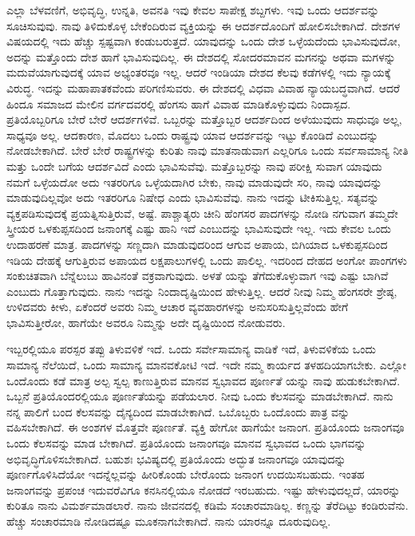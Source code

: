 ಎಲ್ಲಾ ಬೆಳವಣಿಗೆ, ಅಭಿವೃದ್ಧಿ, ಉನ್ನತಿ, ಅವನತಿ ಇವು ಕೇವಲ ಸಾಪೇಕ್ಷ ಶಬ್ದಗಳು. ಇವು ಒಂದು ಆದರ್ಶವನ್ನು ಸೂಚಿಸುವುವು. ನಾವು ತಿಳಿದುಕೊಳ್ಳ ಬೇಕೆಂದಿರುವ ವ್ಯಕ್ತಿಯನ್ನು ಈ ಆದರ್ಶದೊಂದಿಗೆ ಹೋಲಿಸಬೇಕಾಗಿದೆ. ದೇಶಗಳ ವಿಷಯದಲ್ಲಿ ಇದು ಹೆಚ್ಚು ಸ್ಪಷ್ಟವಾಗಿ ಕಂಡುಬರುತ್ತದೆ. ಯಾವುದನ್ನು ಒಂದು ದೇಶ ಒಳ್ಳೆಯದೆಂದು ಭಾವಿಸುವುದೋ, ಅದನ್ನು ಮತ್ತೊಂದು ದೇಶ ಹಾಗೆ ಭಾವಿಸುವುದಿಲ್ಲ. ಈ ದೇಶದಲ್ಲಿ ಸೋದರಮಾವನ ಮಗನನ್ನು ಅಥವಾ ಮಗಳನ್ನು ಮದುವೆಯಾಗುವುದಕ್ಕೆ ಯಾವ ಅಭ್ಯಂತರವೂ ಇಲ್ಲ. ಆದರೆ ಇಂಡಿಯಾ ದೇಶದ ಕೆಲವು ಕಡೆಗಳಲ್ಲಿ ಇದು ನ್ಯಾಯಕ್ಕೆ ವಿರುದ್ಧ. ಇದನ್ನು ಮಹಾಪಾತಕವೆಂದು ಪರಿಗಣಿಸುವರು. ಈ ದೇಶದಲ್ಲಿ ವಿಧವಾ ವಿವಾಹ ನ್ಯಾಯಬದ್ಧವಾಗಿದೆ. ಆದರೆ ಹಿಂದೂ ಸಮಾಜದ ಮೇಲಿನ ವರ್ಗದವರಲ್ಲಿ ಹೆಂಗಸು ಹಾಗೆ ವಿವಾಹ ಮಾಡಿಕೊಳ್ಳುವುದು ನಿಂದಾಸ್ಪದ. ಪ್ರತಿಯೊಬ್ಬರಿಗೂ ಬೇರೆ ಬೇರೆ ಆದರ್ಶಗಳಿವೆ. ಒಬ್ಬರನ್ನು ಮತ್ತೊಬ್ಬರ ಆದರ್ಶದಿಂದ ಅಳೆಯುವುದು ಸಾಧುವೂ ಅಲ್ಲ, ಸಾಧ್ಯವೂ ಅಲ್ಲ. ಆದಕಾರಣ, ಮೊದಲು ಒಂದು ರಾಷ್ಟ್ರವು ಯಾವ ಆದರ್ಶವನ್ನು ಇಟ್ಟು ಕೊಂಡಿದೆ ಎಂಬುದನ್ನು ನೋಡಬೇಕಾಗಿದೆ. ಬೇರೆ ಬೇರೆ ರಾಷ್ಟ್ರಗಳನ್ನು ಕುರಿತು ನಾವು ಮಾತನಾಡುವಾಗ ಎಲ್ಲರಿಗೂ ಒಂದು ಸರ್ವಸಾಮಾನ್ಯ ನೀತಿ ಮತ್ತು ಒಂದೇ ಬಗೆಯ ಆದರ್ಶವಿದೆ ಎಂದು ಭಾವಿಸುವೆವು. ಮತ್ತೊಬ್ಬರನ್ನು ನಾವು ಪರೀಕ್ಷಿ ಸುವಾಗ ಯಾವುದು ನಮಗೆ ಒಳ್ಳೆಯದೋ ಅದು ಇತರರಿಗೂ ಒಳ್ಳೆಯದಾಗಿರ ಬೇಕು, ನಾವು ಮಾಡುವುದೇ ಸರಿ, ನಾವು ಯಾವುದನ್ನು ಮಾಡುವುದಿಲ್ಲವೋ ಅದು ಇತರರಿಗೂ ನಿಷೇಧ ಎಂದು ಭಾವಿಸುವೆವು. ನಾನು ಇದನ್ನು ಟೀಕಿಸುತ್ತಿಲ್ಲ. ಸತ್ಯವನ್ನು ವ್ಯಕ್ತಪಡಿಸುವುದಕ್ಕೆ ಪ್ರಯತ್ನಿಸುತ್ತಿರುವೆ, ಅಷ್ಟೆ. ಪಾಶ್ಚಾತ್ಯರು ಚೀನಿ ಹೆಂಗಸರ ಪಾದಗಳನ್ನು ನೋಡಿ ನಗುವಾಗ ತಮ್ಮದೇ ಸ್ತ್ರೀಯರ ಒಳಕುಪ್ಪಸದಿಂದ ಜನಾಂಗಕ್ಕೆ ಎಷ್ಟು ಹಾನಿ ಇದೆ ಎಂಬುದನ್ನು ಭಾವಿಸುವುದೇ ಇಲ್ಲ. ಇದು ಕೇವಲ ಒಂದು ಉದಾಹರಣೆ ಮಾತ್ರ. ಪಾದಗಳನ್ನು ಸಣ್ಣದಾಗಿ ಮಾಡುವುದರಿಂದ ಆಗುವ ಅಪಾಯ, ಬಿಗಿಯಾದ ಒಳಕುಪ್ಪಸದಿಂದ ಇಡಿಯ ದೇಹಕ್ಕೆ ಆಗುತ್ತಿರುವ ಅಪಾಯದ ಲಕ್ಷಪಾಲುಗಳಲ್ಲಿ ಒಂದು ಪಾಲಿಲ್ಲ. ಇದರಿಂದ ದೇಹದ ಅಂಗೋ ಪಾಂಗಗಳು ಸಂಕುಚಿತವಾಗಿ ಬೆನ್ನೆಲುಬು ಹಾವಿನಂತೆ ವಕ್ರವಾಗುವುದು. ಅಳತೆ ಯನ್ನು ತೆಗೆದುಕೊಳ್ಳುವಾಗ ಇವು ಎಷ್ಟು ಬಾಗಿವೆ ಎಂಬುದು ಗೊತ್ತಾಗುವುದು. ನಾನು ಇದನ್ನು ನಿಂದಾದೃಷ್ಟಿಯಿಂದ ಹೇಳುತ್ತಿಲ್ಲ. ಆದರೆ ನೀವು ನಿಮ್ಮ ಹೆಂಗಸರೇ ಶ್ರೇಷ್ಠ, ಉಳಿದವರು ಕೀಳು, ಏಕೆಂದರೆ ಅವರು ನಿಮ್ಮ ಆಚಾರ ವ್ಯವಹಾರಗಳನ್ನು ಅನುಸರಿಸುತ್ತಿಲ್ಲವೆಂದು ಹೇಗೆ ಭಾವಿಸುತ್ತೀರೋ, ಹಾಗೆಯೇ ಅವರೂ ನಿಮ್ಮನ್ನು ಅದೇ ದೃಷ್ಟಿಯಿಂದ ನೋಡುವರು.

ಇಬ್ಬರಲ್ಲಿಯೂ ಪರಸ್ಪರ ತಪ್ಪು ತಿಳುವಳಿಕೆ ಇದೆ. ಒಂದು ಸರ್ವೇಸಾಮಾನ್ಯ ವಾಡಿಕೆ ಇದೆ, ತಿಳುವಳಿಕೆಯ ಒಂದು ಸಾಮಾನ್ಯ ನೆಲೆಯಿದೆ, ಒಂದು ಸಾಮಾನ್ಯ ಮಾನವಕೋಟಿ ಇದೆ. ಇದೇ ನಮ್ಮ ಕಾರ್ಯದ ತಳಹದಿಯಾಗಬೇಕು. ಎಲ್ಲೋ ಒಂದೊಂದು ಕಡೆ ಮಾತ್ರ ಅಲ್ಪ ಸ್ವಲ್ಪ ಕಾಣುತ್ತಿರುವ ಮಾನವ ಸ್ವಭಾವದ ಪೂರ್ಣತೆ ಯನ್ನು ನಾವು ಹುಡುಕಬೇಕಾಗಿದೆ. ಒಬ್ಬನೆ ಪ್ರತಿಯೊಂದರಲ್ಲಿಯೂ ಪೂರ್ಣತೆಯನ್ನು ಪಡೆಯಲಾರ. ನೀವು ಒಂದು ಕೆಲಸವನ್ನು ಮಾಡಬೇಕಾಗಿದೆ. ನಾನು ನನ್ನ ಪಾಲಿಗೆ ಬಂದ ಕೆಲಸವನ್ನು ದೈನ್ಯದಿಂದ ಮಾಡಬೇಕಾಗಿದೆ. ಒಬೊಬ್ಬರು ಒಂದೊಂದು ಪಾತ್ರ ವನ್ನು ವಹಿಸಬೇಕಾಗಿದೆ. ಈ ಅಂಶಗಳ ಮೊತ್ತವೇ ಪೂರ್ಣತೆ. ವ್ಯಕ್ತಿ ಹೇಗೋ ಹಾಗೆಯೇ ಜನಾಂಗ. ಪ್ರತಿಯೊಂದು ಜನಾಂಗವೂ ಒಂದು ಕೆಲಸವನ್ನು ಮಾಡ ಬೇಕಾಗಿದೆ. ಪ್ರತಿಯೊಂದು ಜನಾಂಗವೂ ಮಾನವ ಸ್ವಭಾವದ ಒಂದು ಭಾಗವನ್ನು ಅಭಿವೃದ್ಧಿಗೊಳಿಸಬೇಕಾಗಿದೆ. ಬಹುಶಃ ಭವಿಷ್ಯದಲ್ಲಿ ಪ್ರತಿಯೊಂದು ಅದ್ಭುತ ಜನಾಂಗವೂ ಯಾವುದನ್ನು ಪೂರ್ಣಗೊಳಿಸಿದೆಯೋ ಇದನ್ನೆಲ್ಲವನ್ನು ಹೀರಿಕೊಂಡು ಬೇರೊಂದು ಜನಾಂಗ ಉದಯಿಸಬಹುದು. ಇಂತಹ ಜನಾಂಗವನ್ನು ಪ್ರಪಂಚ ಇದುವರೆವಿಗೂ ಕನಸಿನಲ್ಲಿಯೂ ನೋಡದೆ ಇರಬಹುದು. ಇಷ್ಟು ಹೇಳುವುದಲ್ಲದೆ, ಯಾರನ್ನು ಕುರಿತೂ ನಾನು ವಿಮರ್ಶಮಾಡಲಾರೆ. ನಾನು ಜೀವನದಲ್ಲಿ ಕಡಿಮೆ ಸಂಚಾರಮಾಡಿಲ್ಲ. ಕಣ್ಣನ್ನು ತೆರೆದಿಟ್ಟು ಕಂಡಿರುವೆನು. ಹೆಚ್ಚು ಸಂಚಾರಮಾಡಿ ನೋಡಿದಷ್ಟೂ ಮೂಕನಾಗಬೇಕಾಗಿದೆ. ನಾನು ಯಾರನ್ನೂ ದೂರುವುದಿಲ್ಲ.

